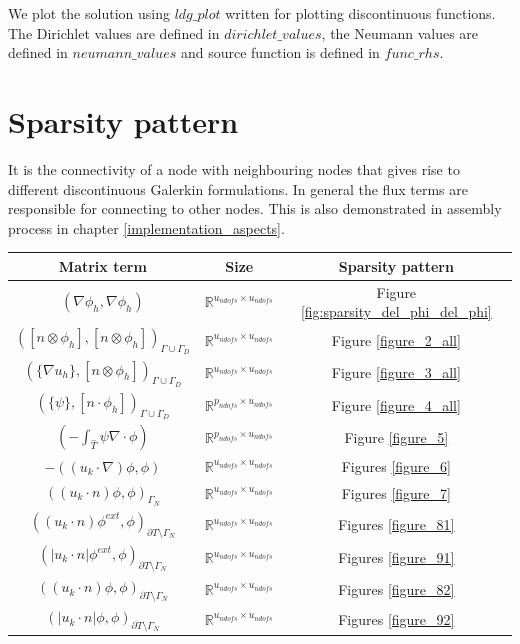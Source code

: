 \documentclass[a4paper,12pt]{book}
\begin{document}
We plot the solution using  $ldg\_plot$ written for plotting discontinuous functions. The Dirichlet values are defined in $dirichlet\_values$, the Neumann values are defined in $neumann\_values$ and source function is defined in $func\_rhs$. 

\section{Sparsity pattern}

It is the connectivity of a node with neighbouring nodes that gives rise to different discontinuous Galerkin formulations. In general the flux terms are responsible for connecting to other nodes. This is also demonstrated in assembly process in chapter \ref{implementation_aspects}. 

\begin{center}
\begin{tabular}{|c|c|c|}
\hline
\textbf{Matrix term} & \textbf{Size} & \textbf{Sparsity pattern} \\
\hline
$(\nabla \phi_h, \nabla \phi_h)$ & $\mathbb{R}^{u_{ndofs} \times u_{ndofs}}$ & Figure \ref{fig:sparsity_del_phi_del_phi}\\
\hline
$([n \otimes \phi_h],[n \otimes \phi_h])_{\Gamma \cup \Gamma_D}$ & $\mathbb{R}^{u_{ndofs} \times u_{ndofs}}$ & Figure \ref{figure_2_all}\\
\hline
$(\lbrace \nabla u_h \rbrace,[n \otimes \phi_h])_{\Gamma \cup \Gamma_D}$ & $\mathbb{R}^{u_{ndofs} \times u_{ndofs}}$ & Figure \ref{figure_3_all}\\
\hline
$(\lbrace \psi \rbrace,[n \cdot \phi_h])_{\Gamma \cup \Gamma_D}$ & $\mathbb{R}^{p_{ndofs} \times u_{ndofs}}$ & Figure \ref{figure_4_all}\\
\hline
$(- \int_{\hat{T}} \psi \nabla \cdot \phi)$ & $\mathbb{R}^{p_{ndofs} \times u_{ndofs}}$ & Figure \ref{figure_5} \\
\hline
$-((u_k \cdot \nabla)\phi , \phi)$ & $\mathbb{R}^{u_{ndofs} \times u_{ndofs}}$ & Figures \ref{figure_6}\\
\hline
$((u_k \cdot n)\phi , \phi)_{\Gamma_N}$ & $\mathbb{R}^{u_{ndofs} \times u_{ndofs}}$ & Figures \ref{figure_7}\\
\hline
$((u_k \cdot n)\phi^{ext},\phi)_{\partial T \setminus \Gamma_N}$ & $\mathbb{R}^{u_{ndofs} \times u_{ndofs}}$ & Figures \ref{figure_81}\\
\hline
$(|u_k \cdot n|\phi^{ext},\phi)_{\partial T \setminus \Gamma_N}$ & $\mathbb{R}^{u_{ndofs} \times u_{ndofs}}$ & Figures \ref{figure_91}\\
\hline
$((u_k \cdot n)\phi,\phi)_{\partial T \setminus \Gamma_N}$ & $\mathbb{R}^{u_{ndofs} \times u_{ndofs}}$ & Figures \ref{figure_82}\\
\hline
$(|u_k \cdot n|\phi,\phi)_{\partial T \setminus \Gamma_N}$ & $\mathbb{R}^{u_{ndofs} \times u_{ndofs}}$ & Figures \ref{figure_92}\\
\hline
\end{tabular}
\end{center}
\end{document}
